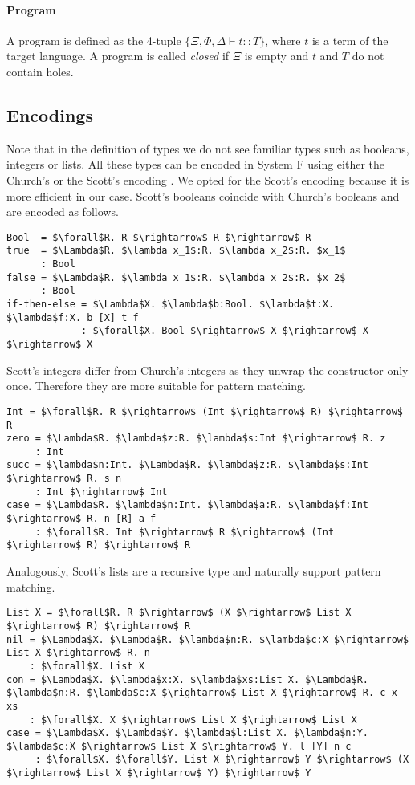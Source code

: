 \paragraph{Program} A program is defined as the 4-tuple $\{\Xi, \Phi, \Delta \vdash t :: T\}$, where $t$ is a term of the target language. A program is called \emph{closed} if $\Xi$ is empty and $t$ and $T$ do not contain holes.


  \subsection{Encodings}
Note that in the definition of types we do not see familiar types such as booleans, integers or lists. All these types can be encoded in System F using either the Church's or the Scott's encoding \cite{ScottNumerals}. We opted for the Scott's encoding because it is more efficient in our case.
Scott's booleans coincide with Church's booleans and are encoded as follows.
\begin{lstlisting}[style=plain, mathescape]
Bool  = $\forall$R. R $\rightarrow$ R $\rightarrow$ R
true  = $\Lambda$R. $\lambda x_1$:R. $\lambda x_2$:R. $x_1$
      : Bool
false = $\Lambda$R. $\lambda x_1$:R. $\lambda x_2$:R. $x_2$
      : Bool
if-then-else = $\Lambda$X. $\lambda$b:Bool. $\lambda$t:X. $\lambda$f:X. b [X] t f
             : $\forall$X. Bool $\rightarrow$ X $\rightarrow$ X $\rightarrow$ X
\end{lstlisting}

Scott's integers differ from Church's integers as they unwrap the constructor only once. Therefore they are more suitable for pattern matching.
\begin{lstlisting}[style=plain, mathescape]
Int = $\forall$R. R $\rightarrow$ (Int $\rightarrow$ R) $\rightarrow$ R
zero = $\Lambda$R. $\lambda$z:R. $\lambda$s:Int $\rightarrow$ R. z
     : Int
succ = $\lambda$n:Int. $\Lambda$R. $\lambda$z:R. $\lambda$s:Int $\rightarrow$ R. s n
     : Int $\rightarrow$ Int
case = $\Lambda$R. $\lambda$n:Int. $\lambda$a:R. $\lambda$f:Int $\rightarrow$ R. n [R] a f
     : $\forall$R. Int $\rightarrow$ R $\rightarrow$ (Int $\rightarrow$ R) $\rightarrow$ R
\end{lstlisting}

Analogously, Scott's lists are a recursive type and naturally support pattern matching.
\begin{lstlisting}[style=plain, mathescape]
List X = $\forall$R. R $\rightarrow$ (X $\rightarrow$ List X $\rightarrow$ R) $\rightarrow$ R
nil = $\Lambda$X. $\Lambda$R. $\lambda$n:R. $\lambda$c:X $\rightarrow$ List X $\rightarrow$ R. n
    : $\forall$X. List X
con = $\Lambda$X. $\lambda$x:X. $\lambda$xs:List X. $\Lambda$R. $\lambda$n:R. $\lambda$c:X $\rightarrow$ List X $\rightarrow$ R. c x xs
    : $\forall$X. X $\rightarrow$ List X $\rightarrow$ List X
case = $\Lambda$X. $\Lambda$Y. $\lambda$l:List X. $\lambda$n:Y. $\lambda$c:X $\rightarrow$ List X $\rightarrow$ Y. l [Y] n c
     : $\forall$X. $\forall$Y. List X $\rightarrow$ Y $\rightarrow$ (X $\rightarrow$ List X $\rightarrow$ Y) $\rightarrow$ Y
\end{lstlisting} 
 
